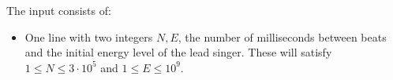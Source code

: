 
    The input consists of:
    \begin{itemize}
        \item One line with two integers $N, E$, the number of milliseconds between beats and the initial energy level of the lead singer. These will satisfy $1 \leq N \leq 3 \cdot 10^5$ and $1 \leq E \leq 10^9$.
    \end{itemize}

